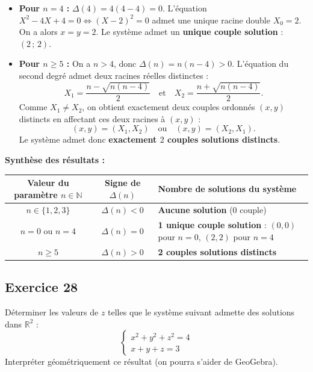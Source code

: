\documentclass[11pt,a4paper]{article}
\begin{document}
\begin{correctionbox}
\begin{itemize}[leftmargin=*,label=\textbullet]
    \item \textbf{Pour $n = 4$ :}
    $\Delta(4) = 4(4 - 4) = 0$. L'équation $X^2 - 4X + 4 = 0 \iff (X - 2)^2 = 0$ admet une unique racine double $X_0 = 2$.
    On a alors $x = y = 2$.
    Le système admet un \textbf{unique couple solution} : $(2\,;\,2)$.

    \item \textbf{Pour $n \ge 5$ :}
    On a $n > 4$, donc $\Delta(n) = n(n - 4) > 0$.
    L'équation du second degré admet deux racines réelles distinctes :
    \[
    X_1 = \frac{n - \sqrt{n(n-4)}}{2} \quad \text{et} \quad X_2 = \frac{n + \sqrt{n(n-4)}}{2}.
    \]
    Comme $X_1 \ne X_2$, on obtient exactement deux couples ordonnés $(x, y)$ distincts en affectant ces deux racines à $(x, y)$ :
    \[
    (x, y) = (X_1, X_2) \quad \text{ou} \quad (x, y) = (X_2, X_1).
    \]
    Le système admet donc \textbf{exactement $2$ couples solutions distincts}.
\end{itemize}

\textbf{Synthèse des résultats :}
\begin{center}
\renewcommand{\arraystretch}{1.3}
\begin{tabular}{|c|c|l|}
\hline
\textbf{Valeur du paramètre $n \in \mathbb{N}$} & \textbf{Signe de $\Delta(n)$} & \textbf{Nombre de solutions du système} \\
\hline
$n \in \{1, 2, 3\}$ & $\Delta(n) < 0$ & \textbf{Aucune solution} ($0$ couple) \\
\hline
$n = 0$ ou $n = 4$ & $\Delta(n) = 0$ & \textbf{1 unique couple solution} : $(0,0)$ pour $n=0$, $(2,2)$ pour $n=4$ \\
\hline
$n \ge 5$ & $\Delta(n) > 0$ & \textbf{2 couples solutions distincts} \\
\hline
\end{tabular}
\end{center}
\end{correctionbox}

\subsection*{Exercice 28}
Déterminer les valeurs de $z$ telles que le système suivant admette des solutions dans $\mathbb{R}^2$ :
\[
\begin{cases}
x^2 + y^2 + z^2 = 4 \\
x + y + z = 3
\end{cases}
\]
Interpréter géométriquement ce résultat (on pourra s'aider de GeoGebra).
\end{document}
